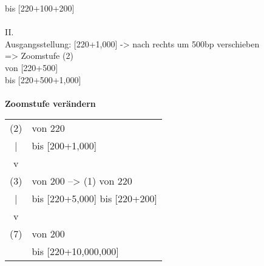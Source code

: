 \documentclass{scrartcl}
\begin{document}
\hspace*{0.6cm} bis [220+100+200]\\
\\
II.\\
Ausgangsstellung: [220+1,000] -> nach rechts um 500bp verschieben\\
=>  Zoomstufe (2)\\
\hspace*{0.6cm} von [220+500]\\
\hspace*{0.6cm} bis [220+500+1,000]\\
\\
\textbf{Zoomstufe verändern}\\
\begin{tabular}{c l}
(2) & von 220\\
 |  & bis [200+1,000]\\
 v &\\
(3) & von 200      \hspace*{1cm}  --> (1) von 220\\
 |  & bis [220+5,000]  \hspace*{1cm}       bis [220+200]\\
 v &\\
(7) & von 200\\
    & bis [220+10,000,000]\\
\end{tabular}
\newpage\hfill\\
\end{document}
